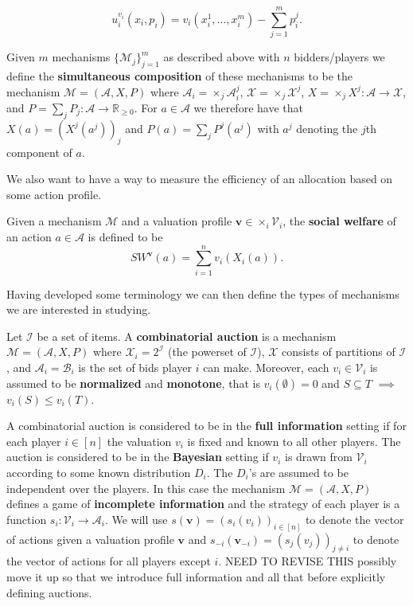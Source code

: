 \begin{equation}
  u_i^{v_i}(x_i, p_i) = v_i(x_i^{1}, \ldots, x_i^{m}) - \sum_{j = 1}^{m} p_i^{j}.
\end{equation}
\begin{definition}
  Given $ m $ mechanisms $ \{\mathcal{M}_j\}_{j=1}^m $ as described above with $ n $ bidders/players we define the \textbf{simultaneous composition} of these mechanisms to be the mechanism $ \mathcal{M} = (\mathcal{A}, X, P) $ where $ \mathcal{A}_i = \times_j \mathcal{A}_i^{j} $, $ \mathcal{X} = \times_j \mathcal{X}^{j} $, $ X = \times_j X^{j}: \mathcal{A} \to \mathcal{X} $, and $ P = \sum_{j} P_j: \mathcal{A} \to \mathbb{R}_{\geq 0} $. For $ a \in \mathcal{A} $ we therefore have that $ X(a) = (X^j(a^j))_j $ and $ P(a) = \sum_{j} P^j(a^j) $ with $ a^j $ denoting the $ j $th component of $ a $.
\end{definition}
We also want to have a way to measure the efficiency of an allocation based on some action profile.
\begin{definition}
  Given a mechanism $ \mathcal{M} $ and a valuation profile $ \mathbf{v} \in \times_i \mathcal{V}_i $, the \textbf{social welfare} of an action $ a \in \mathcal{A} $ is defined to be
  \begin{equation}
    SW^\mathbf{v}(a) = \sum_{i = 1}^{n} v_i(X_i(a)).
    \label{eq:social}
  \end{equation}
\end{definition}

Having developed some terminology we can then define the types of mechanisms we are interested in studying.
\begin{definition}
  Let $ \mathcal{I} $ be a set of items. A \textbf{combinatorial auction} is a mechanism $ \mathcal{M} = (\mathcal{A}, X, P) $ where $ \mathcal{X}_i = 2^\mathcal{I} $ (the powerset of $ \mathcal{I} $), $ \mathcal{X} $ consists of partitions of $ \mathcal{I} $, and $ \mathcal{A}_i = \mathcal{B}_i $ is the set of bids player $ i $ can make. Moreover, each $ v_i \in \mathcal{V}_i $ is assumed to be \textbf{normalized} and \textbf{monotone}, that is $ v_i(\emptyset) = 0 $ and $ S \subseteq T $ $ \implies $ $ v_i(S) \leq v_i(T) $.
\end{definition}
A combinatorial auction is considered to be in the \textbf{full information} setting if for each player $ i \in [n] $ the valuation $ v_i $ is fixed and known to all other players. The auction is considered to be in the \textbf{Bayesian} setting if $ v_i $ is drawn from $ \mathcal{V}_i $ according to some known distribution $ D_i $. The $ D_i $'s are assumed to be independent over the players. In this case the mechanism $ \mathcal{M} = (\mathcal{A}, X, P) $ defines a game of \textbf{incomplete information} and the strategy of each player is a function $ s_i : \mathcal{V}_i \to \mathcal{A}_i $. We will use $ s(\mathbf{v}) = (s_i(v_i))_{i \in [n]} $ to denote the vector of actions given a valuation profile $ \mathbf{v} $ and $ s_{-i}(\mathbf{v}_{-i}) = (s_j(v_j))_{ j \neq i} $ to denote the vector of actions for all players except $ i $. NEED TO REVISE THIS possibly move it up so that we introduce full information and all that before explicitly defining auctions.

